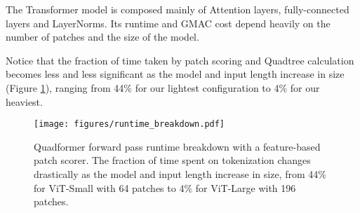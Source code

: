 The Transformer model is composed mainly of Attention layers, fully-connected layers and LayerNorms. Its runtime and GMAC cost depend heavily on the number of patches and the size of the model.

Notice that the fraction of time taken by patch scoring and Quadtree calculation becomes less and less significant as the model and input length increase in size (Figure \ref{figure:runtime_breakdown}), ranging from 44\% for our lightest configuration to 4\% for our heaviest.



\begin{figure}[t!]
  \centering
  \vspace*{-5pt}
  \hspace*{-0.035\linewidth}
  \texttt{[image: figures/runtime\_breakdown.pdf]}
  \caption{Quadformer forward pass runtime breakdown with a feature-based patch scorer. The fraction of time spent on tokenization changes drastically as the model and input length increase in size, from 44\% for ViT-Small with 64 patches to 4\% for ViT-Large with 196 patches.}
  \label{figure:runtime_breakdown}
\end{figure}



